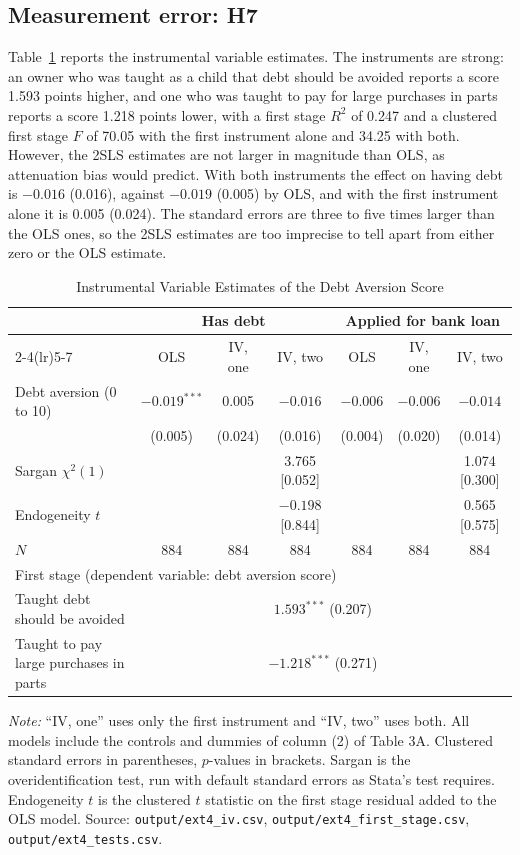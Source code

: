 \documentclass[preprint,letterpaper,11pt,authoryear]{elsarticle}
\newenvironment{tablenotes}{\par\vspace{3pt}\begin{minipage}{0.95\linewidth}\footnotesize\textit{Note:} }{\end{minipage}}
\begin{document}
\subsection{Measurement error: H7}

Table~\ref{tab:iv} reports the instrumental variable estimates. The instruments are strong: an owner who was taught as a child that debt should be avoided reports a score 1.593 points higher, and one who was taught to pay for large purchases in parts reports a score 1.218 points lower, with a first stage $R^2$ of 0.247 and a clustered first stage $F$ of 70.05 with the first instrument alone and 34.25 with both. However, the 2SLS estimates are not larger in magnitude than OLS, as attenuation bias would predict. With both instruments the effect on having debt is $-0.016$ (0.016), against $-0.019$ (0.005) by OLS, and with the first instrument alone it is 0.005 (0.024). The standard errors are three to five times larger than the OLS ones, so the 2SLS estimates are too imprecise to tell apart from either zero or the OLS estimate.

\begin{table}[!htbp]
\centering\small\setlength{\tabcolsep}{2.5pt}
\caption{Instrumental Variable Estimates of the Debt Aversion Score}
\label{tab:iv}
\begin{tabular}{lcccccc}
\toprule
 & \multicolumn{3}{c}{Has debt} & \multicolumn{3}{c}{Applied for bank loan} \\
\cmidrule(lr){2-4}\cmidrule(lr){5-7}
 & OLS & IV, one & IV, two & OLS & IV, one & IV, two \\
\midrule
Debt aversion (0 to 10) & $-0.019^{***}$ & 0.005 & $-0.016$ & $-0.006$ & $-0.006$ & $-0.014$ \\
 & (0.005) & (0.024) & (0.016) & (0.004) & (0.020) & (0.014) \\
\midrule
Sargan $\chi^2(1)$ & & & 3.765 [0.052] & & & 1.074 [0.300] \\
Endogeneity $t$ & & & $-0.198$ [0.844] & & & 0.565 [0.575] \\
$N$ & 884 & 884 & 884 & 884 & 884 & 884 \\
\midrule
\multicolumn{7}{l}{First stage (dependent variable: debt aversion score)} \\
Taught debt should be avoided & \multicolumn{6}{c}{$1.593^{***}$ (0.207)} \\
Taught to pay large purchases in parts & \multicolumn{6}{c}{$-1.218^{***}$ (0.271)} \\
\bottomrule
\end{tabular}
\begin{tablenotes}
``IV, one'' uses only the first instrument and ``IV, two'' uses both. All models include the controls and dummies of column (2) of Table 3A. Clustered standard errors in parentheses, $p$-values in brackets. Sargan is the overidentification test, run with default standard errors as Stata's test requires. Endogeneity $t$ is the clustered $t$ statistic on the first stage residual added to the OLS model. Source: \texttt{output/ext4\_iv.csv}, \texttt{output/ext4\_first\_stage.csv}, \texttt{output/ext4\_tests.csv}.
\end{tablenotes}
\end{table}
\end{document}
